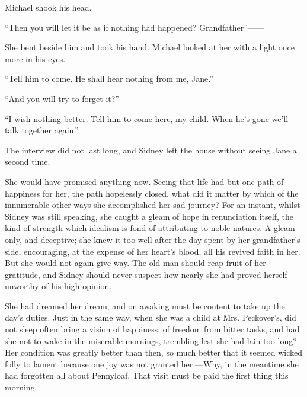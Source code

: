 Michael shook his head.

``Then you will let it be as if nothing had happened?
Grandfather''{{------}}

She bent beside him and took his hand. Michael looked at her with a
light once more in his eyes.

``Tell him to come. He shall hear nothing from me, Jane.''

``And you will try to forget it?''

``I wish nothing better. Tell him to come here, my child. When he's gone
we'll talk together again.''

The interview did not last long, and Sidney
{\protect\hypertarget{154}{}{}}left the house without seeing Jane a
second time.

She would have promised anything now. Seeing that life had but one path
of happiness for her, the path hopelessly closed, what did it matter by
which of the innumerable other ways she accomplished her sad journey?
For an instant, whilst Sidney was still speaking, she caught a gleam of
hope in renunciation itself, the kind of strength which idealism is fond
of attributing to noble natures. A gleam only, and deceptive; she knew
it too well after the day spent by her grandfather's side, encouraging,
at the expense of her heart's blood, all his revived faith in her. But
she would not again give way. The old man should reap fruit of her
gratitude, and Sidney should never suspect how nearly she had proved
herself unworthy of his high opinion.

She had dreamed her dream, and on awaking must be content to take up the
day's duties. Just in the same way, when she was a child at Mrs.
Peckover's, did not sleep often bring a vision of happiness, of freedom
from bitter tasks, and had she not to wake in the
{\protect\hypertarget{155}{}{}}miserable mornings, trembling lest she
had lain too long? Her condition was greatly better than then, so much
better that it seemed wicked folly to lament because one joy was not
granted her.---Why, in the meantime she had forgotten all about
Pennyloaf. That visit must be paid the first thing this morning.
